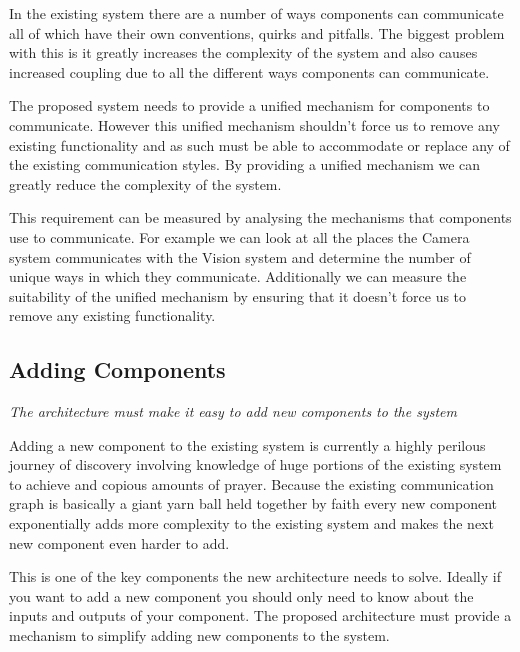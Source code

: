 \documentclass[english,12pt]{scrartcl}
\newcommand{\requirement}[1]{\textit{#1}}
\begin{document}
            In the existing system there are a number of ways components can communicate all of
            which have their own conventions, quirks and pitfalls. The biggest problem with this is
            it greatly increases the complexity of the system and also causes increased coupling due
            to all the different ways components can communicate.
            
            The proposed system needs to provide a unified mechanism for components to communicate.
            However this unified mechanism shouldn't force us to remove any existing functionality
            and as such must be able to accommodate or replace any of the existing communication
            styles. By providing a unified mechanism we can greatly reduce the complexity of the
            system.
            
            This requirement can be measured by analysing the mechanisms that components use to
            communicate. For example we can look at all the places the Camera system communicates
            with the Vision system and determine the number of unique ways in which they
            communicate. Additionally we can measure the suitability of the unified mechanism by
            ensuring that it doesn't force us to remove any existing functionality.
        
        \subsection{Adding Components}
            \requirement{The architecture must make it easy to add new components to the system}
            
            Adding a new component to the existing system is currently a highly perilous journey of
            discovery involving knowledge of huge portions of the existing system to achieve and
            copious amounts of prayer. Because the existing communication graph is basically a giant 
            yarn ball held together by faith every new component exponentially adds more complexity
            to the existing system and makes the next new component even harder to add.
            
            This is one of the key components the new architecture needs to solve. Ideally if you
            want to add a new component you should only need to know about the inputs and outputs of
            your component. The proposed architecture must provide a mechanism to simplify adding
            new components to the system.
            
\end{document}
